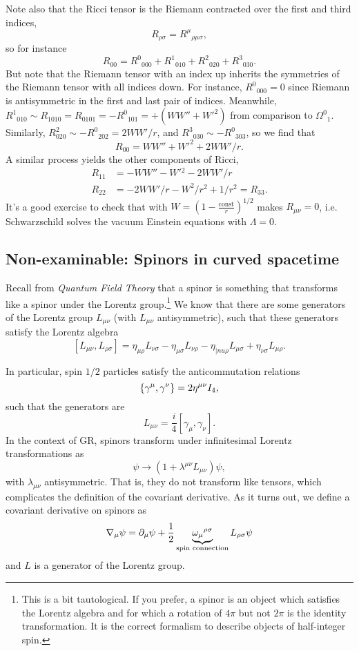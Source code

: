 Note also that the Ricci tensor is the Riemann contracted over the first and third indices,
$$R_{\rho\sigma}=R^\mu{}_{\rho\mu\sigma},$$
so for instance
$$R_{00}=R^0{}_{000}+R^1{}_{010}+R^2{}_{020}+R^3{}_{030}.$$
But note that the Riemann tensor with an index up inherits the symmetries of the Riemann tensor with all indices down. For instance, $R^0{}_{000}=0$ since Riemann is antisymmetric in the first and last pair of indices. Meanwhile, $R^1{}_{010}\sim R_{1010}=R_{0101}=-R^0{}_{101}=+(WW'' +{W'}^2)$ from comparison to $\Omega^0{}_1$. Similarly, $R^2_{020}\sim -R^0{}_{202}=2WW'/r$, and $R^3{}_{030}\sim -R^0{}_{303}$, so we find that
$$R_{00}=WW'' + {W'}^2+2WW'/r.$$
A similar process yields the other components of Ricci,
\begin{align*}
    R_{11} &= -WW''-W'{}^2 -2WW'/r\\
    R_{22} &= -2WW'/r -W^2/r^2 +1/r^2 =R_{33}.
\end{align*}
It's a good exercise to check that with $W=\left(1-\frac{\text{const}}{r}\right)^{1/2}$ makes $R_{\mu\nu}=0$, i.e. Schwarzschild solves the vacuum Einstein equations with $\Lambda=0$.

\subsection*{Non-examinable: Spinors in curved spacetime} Recall from \emph{Quantum Field Theory} that a spinor is something that transforms like a spinor under the Lorentz group.\footnote{This is a bit tautological. If you prefer, a spinor is an object which satisfies the Lorentz algebra and for which a rotation of $4\pi$ but not $2\pi$ is the identity transformation. It is the correct formalism to describe objects of half-integer spin.}
We know that there are some generators of the Lorentz group $L_{\mu\nu}$ (with $L_{\mu\nu}$ antisymmetric), such that these generators satisfy the Lorentz algebra
$$[L_{\mu\nu},L_{\rho\sigma}]=\eta_{\mu\rho}L_{\nu\sigma} -\eta_{\mu\sigma}L_{\nu\rho}-\eta_{|nu\rho}L_{\mu\sigma} +\eta_{\nu\sigma}L_{\mu\rho}.$$

In particular, spin $1/2$ particles satisfy the anticommutation relations
$$\{\gamma^\mu,\gamma^\nu\}=2\eta^{\mu\nu} I_4,$$
such that the generators are
$$L_{\mu\nu}=\frac{i}{4}[\gamma_\mu, \gamma_\nu].$$
In the context of GR, spinors transform under infinitesimal Lorentz transformations as
$$\psi \to(1+\lambda^{\mu\nu}L_{\mu\nu})\psi,$$ with $\lambda_{\mu\nu}$ antisymmetric. That is, they do not transform like tensors, which complicates the definition of the covariant derivative. As it turns out, we define a covariant derivative on spinors as
$$\nabla_\mu \psi = \partial_\mu \psi + \frac{1}{2} \underbrace{\omega_\mu{}^{\rho\sigma}}_{\text{spin connection}} L_{\rho\sigma} \psi$$
and $L$ is a generator of the Lorentz group.

